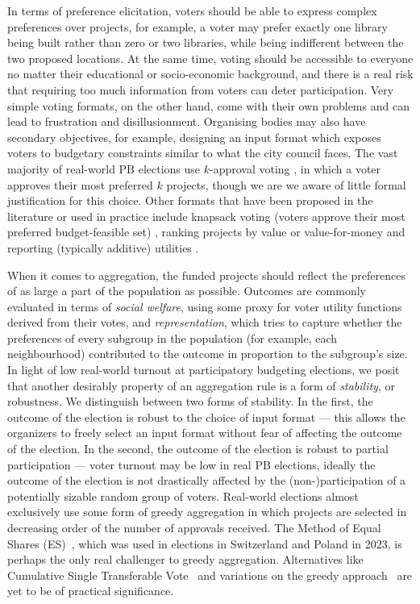 \documentclass[twoside,11pt]{article}
\newcommand{\mes}{ES}
\begin{document}
In terms of preference elicitation,   voters should be able to express complex preferences over projects, for example, a voter may   prefer exactly one library being built rather than zero or two libraries, while being indifferent between the two proposed locations. At the same time, voting should be accessible to everyone  no matter their educational or socio-economic background, and there is a real risk that requiring too much information from voters can deter   participation. 
Very simple voting formats, on the other hand,   come with their own problems and can lead to frustration and disillusionment. 
Organising bodies  may also have secondary objectives, for example, designing an input format which exposes voters to   budgetary constraints similar to what the city council faces.  
%
The vast majority of real-world PB elections use $k$-approval voting \cite{aziz2021participatory}, in which a voter approves their most preferred $k$ projects, though we are we aware of little formal justification for this choice.  Other formats that have been proposed in the literature or used in practice include knapsack voting (voters approve their most preferred budget-feasible set)  \cite{goel2019knapsack}, ranking projects by value or value-for-money  \cite{aziz2020expanding,benade2021preference} and reporting (typically additive)  utilities \cite{peters2021proportional}. 

When it comes to aggregation,  the funded projects should   reflect the preferences of  as large a part of the population as possible. Outcomes are commonly evaluated in terms of \emph{social welfare}, using some proxy for voter utility functions derived from their votes, and \emph{representation}, which tries to capture whether the preferences of every subgroup in the population (for example, each neighbourhood) contributed to the outcome in proportion  to the subgroup's size.
In light of low real-world turnout at participatory budgeting elections, we posit that another desirably property of an aggregation rule is a form of \emph{stability}, or robustness. 
We distinguish between two forms of stability. In the first, the outcome of the election is robust to the choice of input format --- this allows the organizers to freely select an input format without fear of affecting the outcome of the election. In the second, the outcome of the election is robust to partial participation --- voter turnout may be low in real PB elections, ideally the outcome of the election is not drastically affected by the {(non-)participation} of a potentially sizable random   group of   voters. 
%
Real-world elections almost exclusively use some form of greedy aggregation in which projects are selected in decreasing order of the number of approvals   received. The Method of Equal Shares (\mes{})~\cite{peters2021proportional}, which was used in elections in Switzerland and Poland in 2023,  is perhaps the only real challenger to greedy aggregation.
Alternatives like Cumulative Single Transferable Vote~\cite{skowron2020participatory} and variations on the greedy approach~\cite{talmon2019framework}   are yet to be of practical significance.
\end{document}
